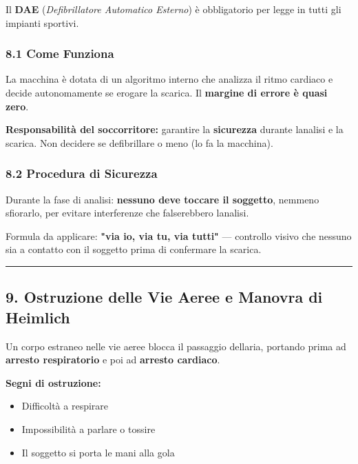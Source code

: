 \documentclass[a4paper,11pt]{article}
\providecommand{\tightlist}{%
  \setlength{\itemsep}{0pt}\setlength{\parskip}{0pt}}
\begin{document}
Il \textbf{DAE} (\emph{Defibrillatore Automatico Esterno}) è
obbligatorio per legge in tutti gli impianti sportivi.

\subsubsection{8.1 Come Funziona}\label{come-funziona}

La macchina è dotata di un algoritmo interno che analizza il ritmo
cardiaco e decide autonomamente se erogare la scarica. Il
\textbf{margine di errore è quasi zero}.

\textbf{Responsabilità del soccorritore:} garantire la
\textbf{sicurezza} durante l\textquotesingle analisi e la scarica. Non
decidere se defibrillare o meno (lo fa la macchina).

\subsubsection{8.2 Procedura di Sicurezza}\label{procedura-di-sicurezza}

Durante la fase di analisi: \textbf{nessuno deve toccare il soggetto},
nemmeno sfiorarlo, per evitare interferenze che falserebbero
l\textquotesingle analisi.

Formula da applicare: \textbf{"via io, via tu, via tutti"} --- controllo
visivo che nessuno sia a contatto con il soggetto prima di confermare la
scarica.

\begin{center}\rule{0.5\linewidth}{0.5pt}\end{center}

\subsection{9. Ostruzione delle Vie Aeree e Manovra di
      Heimlich}\label{ostruzione-delle-vie-aeree-e-manovra-di-heimlich}

Un corpo estraneo nelle vie aeree blocca il passaggio
dell\textquotesingle aria, portando prima ad \textbf{arresto
      respiratorio} e poi ad \textbf{arresto cardiaco}.

\textbf{Segni di ostruzione:}

\begin{itemize}
      \tightlist
      \item
            Difficoltà a respirare
      \item
            Impossibilità a parlare o tossire
      \item
            Il soggetto si porta le mani alla gola
\end{itemize}
\end{document}
